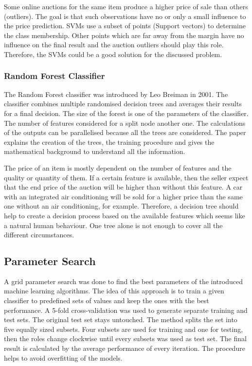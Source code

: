 Some online auctions for the same item produce a higher price of sale than others (outliers). The goal is that such observations have no or only a small influence to the price prediction. SVMs use a subset of points (Support vectors) to determine the class membership. Other points which are far away from the margin have no influence on the final result and the auction outliers should play this role. Therefore, the SVMs could be a good solution for the discussed problem. 
\subsubsection{Random Forest Classifier}
The Random Forest classifier was introduced by Leo Breiman in 2001\cite{breiman}. The classifier combines multiple randomised decision trees and averages their results for a final decision. The size of the forest is one of the parameters of the classifier. The number of features considered for a split node another one. The calculations of the outputs can be parallelised because all the trees are considered. The paper explains the creation of the trees, the training procedure and gives the mathematical background to understand all the information.

The price of an item is mostly dependent on the number of features and the quality or quantity of them. If a certain feature is available, then the seller expect that the end price of the auction will be higher than without this feature. A car with an integrated air conditioning will be sold for a higher price than the same one without an air conditioning, for example. Therefore, a decision tree should help to create a decision process based on the available features which seems like a natural human behaviour. One tree alone is not enough to cover all the different circumstances. 
\subsection{Parameter Search}
A grid parameter search was done to find the best parameters of the introduced machine learning algorithms. The idea of this approach is to train a given classifier to predefined sets of values and keep the ones with the best performance. A 5-fold cross-validation was used to generate separate training and test sets. The original test set stays untouched. The method splits the set into five equally sized subsets. Four subsets are used for training and one for testing, then the roles change clockwise until every subsets was used as test set. The final result is calculated by the average performance of every iteration. The procedure helps to avoid overfitting of the models.
